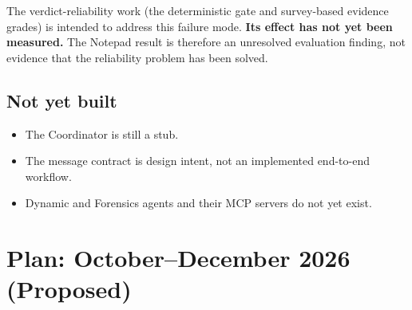 \documentclass[11pt,a4paper]{article}
\begin{document}
The verdict-reliability work (the deterministic gate and survey-based evidence grades) is intended to address this failure mode. \textbf{Its effect has not yet been measured.} The Notepad result is therefore an unresolved evaluation finding, not evidence that the reliability problem has been solved.

\subsection{Not yet built}
\begin{itemize}
  \item The Coordinator is still a stub.
  \item The message contract is design intent, not an implemented end-to-end workflow.
  \item Dynamic and Forensics agents and their MCP servers do not yet exist.
\end{itemize}

\section{Plan: October--December 2026 (Proposed)}
\end{document}
